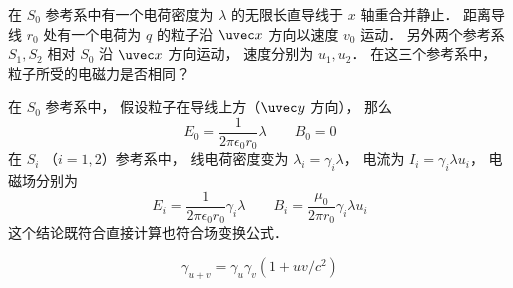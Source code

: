 
\begin{issues}
\issueDraft
\end{issues}


在 $S_0$ 参考系中有一个电荷密度为 $\lambda$ 的无限长直导线于 $x$ 轴重合并静止． 距离导线 $r_0$ 处有一个电荷为 $q$ 的粒子沿 $\uvec x$ 方向以速度 $v_0$ 运动． 另外两个参考系 $S_1, S_2$ 相对 $S_0$ 沿 $\uvec x$ 方向运动， 速度分别为 $u_1, u_2$． 在这三个参考系中， 粒子所受的电磁力是否相同？

在 $S_0$ 参考系中， 假设粒子在导线上方（$\uvec y$ 方向）， 那么
\begin{equation}
E_{0} = \frac{1}{2\pi\epsilon_0 r_0} \lambda
\qquad
B_0 = 0
\end{equation}
在 $S_i$ （$i=1,2$）参考系中， 线电荷密度变为 $\lambda_i = \gamma_i \lambda$， 电流为 $I_i = \gamma_i \lambda u_i$， 电磁场分别为
\begin{equation}
E_i = \frac{1}{2\pi\epsilon_0 r_0} \gamma_i \lambda
\qquad
B_i = \frac{\mu_0}{2\pi r_0}\gamma_i \lambda u_i
\end{equation}
这个结论既符合直接计算也符合场变换公式．

\begin{equation}
\gamma_{u+v} = \gamma_u\gamma_v(1 + uv/c^2)
\end{equation}
